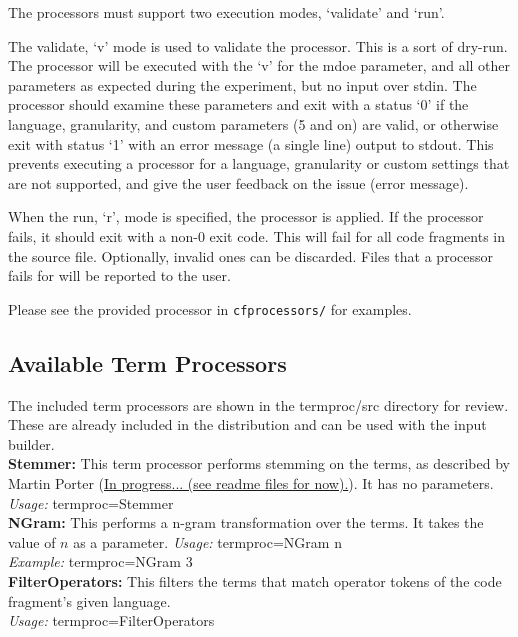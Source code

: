 \documentclass[]{article}
\begin{document}
	The processors must support two execution modes, `validate' and `run'.
	
	The validate, `v' mode is used to validate the processor.  This is a sort of dry-run.  The processor will be executed with the `v' for the mdoe parameter, and all other parameters as expected during the experiment, but no input over stdin.  The processor should examine these parameters and exit with a status `0' if the language, granularity, and custom parameters (5 and on) are valid, or otherwise exit with status `1' with an error message (a single line) output to stdout.  This prevents executing a processor for a language, granularity or custom settings that are not supported, and give the user feedback on the issue (error message).
	
	When the run, `r', mode is specified, the processor is applied.  If the processor fails, it should exit with a non-0 exit code.  This will fail for all code fragments in the source file.  Optionally, invalid ones can be discarded.  Files that a processor fails for will be reported to the user.

	Please see the provided processor in \verb|cfprocessors/| for examples.
	
	\subsection{Available Term Processors}
	The included term processors are shown in the termproc/src directory for review. These are already included in the distribution and can be used with the input builder.\\
	
	\noindent\textbf{Stemmer:} This term processor performs stemming on the terms, as described by Martin Porter (\url{In progress... (see readme files for now).}).  It has no parameters.\\
	\noindent \textit{Usage:}  termproc=Stemmer\\
	
	\noindent\textbf{NGram:} This performs a n-gram transformation over the terms.  It takes the value of $n$ as a parameter.
	\noindent\textit{Usage:} termproc=NGram n\\
	\noindent\textit{Example:} termproc=NGram 3\\
	
	\noindent\textbf{FilterOperators:} This filters the terms that match operator tokens of the code fragment's given language.\\
	\noindent\textit{Usage:} termproc=FilterOperators\\
	
\end{document}
